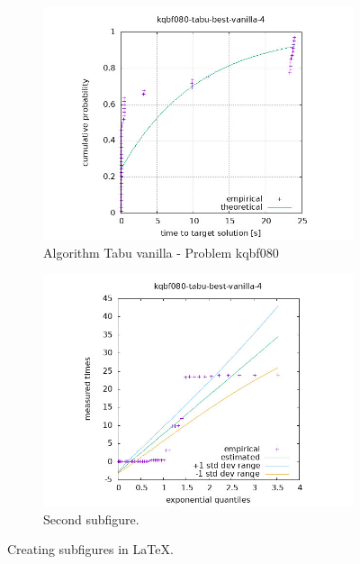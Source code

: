 \begin{figure}[H]
    \centering
    \begin{subfigure}{0.49\textwidth}
        \includegraphics[width=\textwidth]{figure/ttt_plot/kqbf080-tabu-best-vanilla-4-exp.jpeg}
        \caption{Algorithm Tabu vanilla - Problem kqbf080}
        \label{fig:tabu-vanilla-kqbf080-exp}
    \end{subfigure}
    \hfill
    \begin{subfigure}{0.49\textwidth}
        \includegraphics[width=\textwidth]{figure/ttt_plot/kqbf080-tabu-best-vanilla-4-qq.jpeg}
        \caption{Second subfigure.}
        \label{fig:tabu-vanilla-kqbf080-qq}
    \end{subfigure}
    \caption{Creating subfigures in \LaTeX.}
    \label{fig:tabu-vanilla-kqbf080}
\end{figure}
